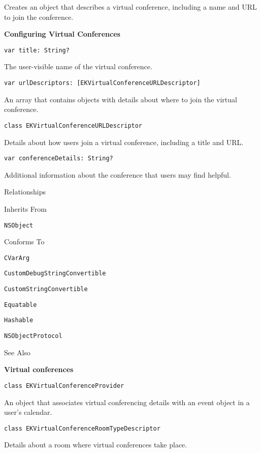 \documentclass{article}
\begin{document}
Creates an object that describes a virtual conference, including a name and URL to join the conference.

\textbf{Configuring Virtual Conferences}

\texttt{var title: String?}

The user-visible name of the virtual conference.

\texttt{var urlDescriptors: [EKVirtualConferenceURLDescriptor]}

An array that contains objects with details about where to join the virtual conference.

\texttt{class EKVirtualConferenceURLDescriptor}

Details about how users join a virtual conference, including a title and URL.

\texttt{var conferenceDetails: String?}

Additional information about the conference that users may find helpful.

Relationships

Inherits From

\texttt{NSObject}

Conforms To

\texttt{CVarArg}

\texttt{CustomDebugStringConvertible}

\texttt{CustomStringConvertible}

\texttt{Equatable}

\texttt{Hashable}

\texttt{NSObjectProtocol}

See Also

\textbf{Virtual conferences}

\texttt{class EKVirtualConferenceProvider}

An object that associates virtual conferencing details with an event object in a user's calendar.

\texttt{class EKVirtualConferenceRoomTypeDescriptor}

Details about a room where virtual conferences take place.

\newpage
\end{document}
